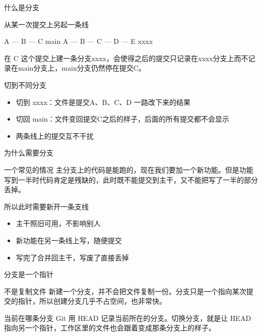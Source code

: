 \documentclass[aspectratio=169]{beamer}
\begin{document}
\begin{frame}[fragile]{什么是分支}
	\begin{block}{从某一次提交上另起一条线}
\begin{semiverbatim}
A --- B --- C                main
A --- B --- C --- D --- E    xxxx
\end{semiverbatim}
		在 C 这个提交上建一条分支xxxx，会使得之后的提交只记录在xxxx分支上而不记录在main分支上，main分支仍然停在提交C。
	\end{block}
	\begin{block}{切到不同分支}
		\begin{itemize}
			\item 切到 xxxx：文件是提交A、B、C、D 一路改下来的结果
			\item 切回 main：文件变回提交C之后的样子，后面的所有提交都不会显示
			\item 两条线上的提交互不干扰
		\end{itemize}
	\end{block}
\end{frame}

\begin{frame}{为什么需要分支}
	\begin{block}{一个常见的情况}
		\hspace*{2em}主分支上的代码是能跑的，现在我们要加一个新功能。但是功能写到一半时代码肯定是残缺的，此时既不能提交到主干，又不能把写了一半的部分丢掉。
	\end{block}
	\begin{block}{所以此时需要新开一条支线}
		\begin{itemize}
			\item 主干照旧可用，不影响别人
			\item 新功能在另一条线上写，随便提交
			\item 写完了合并回主干，写废了直接丢掉
		\end{itemize}
	\end{block}
\end{frame}

\begin{frame}[fragile]{分支是一个指针}
	\begin{block}{不是复制文件}
		\hspace*{2em}新建一个分支，并不会把文件复制一份。分支只是一个指向某次提交的指针，所以创建分支几乎不占空间，也非常快。
	\end{block}
	\begin{block}{当前在哪条分支}
		\hspace*{2em}Git 用 HEAD 记录当前所在的分支。切换分支，就是让 HEAD 指向另一个指针，工作区里的文件也会跟着变成那条分支上的样子。
	\end{block}
\end{frame}
\end{document}
